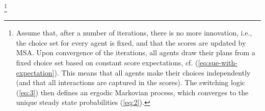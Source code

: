 \footnote{%
%
%
%
%
%
%
%
Assume that, after a number of iterations, there is no more
innovation, i.e., the choice set for every agent is fixed, and that
the scores are updated by MSA.
Upon convergence of the iterations, all agents draw their plans from
a fixed choice set based on constant score expectations, 
cf. (\ref{eq:sue-with-expectation}).
This means that all agents make their choices independently
(and that all interactions are captured in the scores).
The switching logic (\ref{eq:3}) then defines an ergodic Markovian process,
which converges to the unique steady state probabilities (\ref{eq:2}).
%
}

